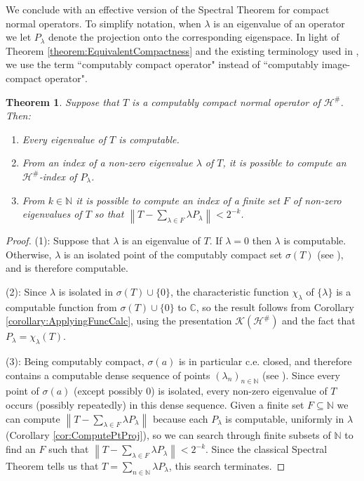 \documentclass{amsart}
\newcommand{\norm}[1]{\left\| #1 \right\|}
\theoremstyle{plain}
\newtheorem{theorem}{Theorem}[section]
\theoremstyle{definition}
\numberwithin{equation}{section}
\begin{document}
We conclude with an effective version of the Spectral Theorem for compact normal operators.  To simplify notation, when $\lambda$ is an eigenvalue of an operator we let $P_\lambda$ denote the projection onto the corresponding eigenspace.  In light of Theorem \ref{theorem:EquivalentCompactness} and the existing terminology used in \cite{BrattkaDillhage.2007}, we use the term ``computably compact operator" instead of ``computably image-compact operator".

\begin{theorem}\label{thm:Spectral}
Suppose that $T$ is a computably compact normal operator of $\mathcal{H}^\#$.  Then:
\begin{enumerate}
\item{Every eigenvalue of $T$ is computable.}
\item{From an index of a non-zero eigenvalue $\lambda$ of $T$, it is possible to compute an $\mathcal{H}^\#$-index of $P_\lambda$.}
\item{From $k \in \mathbb{N}$ it is possible to compute an index of a finite set $F$ of non-zero eigenvalues of $T$ so that $\norm{T - \sum_{\lambda \in F}\lambda P_\lambda} < 2^{-k}$.}
\end{enumerate}
\end{theorem}
\begin{proof}
(1): Suppose that $\lambda$ is an eigenvalue of $T$.  If $\lambda = 0$ then $\lambda$ is computable.  Otherwise, $\lambda$ is an isolated point of the computably compact set $\sigma(T)$ (see \cite[Theorem 1.4.11]{Murphy.1990}), and is therefore computable.

(2): Since $\lambda$ is isolated in $\sigma(T) \cup \{0\}$, the characteristic function $\chi_{\lambda}$ of $\{\lambda\}$ is a computable function from $\sigma(T) \cup \{0\}$ to $\mathbb{C}$, so the result follows from Corollary \ref{corollary:ApplyingFuncCalc}, using the presentation $\mathcal{K}(\mathcal{H}^\#)$ and the fact that $P_\lambda = \chi_{\lambda}(T)$.

(3): Being computably compact, $\sigma(a)$ is in particular c.e. closed, and therefore contains a computable dense sequence of points $(\lambda_n)_{n \in \mathbb{N}}$ (see \cite[Lemma 3.27]{DowneyMelnikov}).  Since every point of $\sigma(a)$ (except possibly $0$) is isolated, every non-zero eigenvalue of $T$ occurs (possibly repeatedly) in this dense sequence.  Given a finite set $F \subseteq \mathbb{N}$ we can compute $\norm{T - \sum_{\lambda \in F}\lambda P_\lambda}$ because each $P_\lambda$ is computable, uniformly in $\lambda$ (Corollary \ref{cor:ComputePtProj}), so we can search through finite subsets of $\mathbb{N}$ to find an $F$ such that $\norm{T - \sum_{\lambda \in F}\lambda P_\lambda} < 2^{-k}$.  Since the classical Spectral Theorem tells us that $T = \sum_{n \in \mathbb{N}}\lambda P_\lambda$, this search terminates.
\end{proof}




\end{document}
